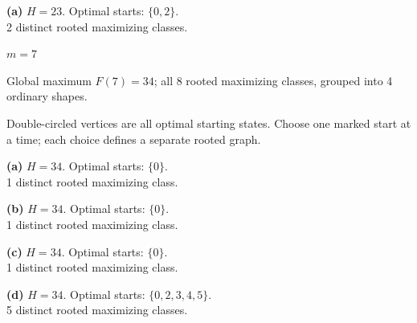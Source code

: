 \documentclass[11pt,a4paper]{article}
\begin{document}
\begin{minipage}[t]{.94\textwidth}\centering
\resizebox{10.3cm}{!}{}\par
\small\textbf{(a)} $H=23$. Optimal starts: $\{0, 2\}$.\\2 distinct rooted maximizing classes.\par\end{minipage}
\clearpage
{\LARGE\bfseries $m=7$}\par\vspace{3mm}
Global maximum $F(7)=34$; all 8 rooted maximizing classes, grouped into 4 ordinary shapes.\par\vspace{2mm}
Double-circled vertices are all optimal starting states. Choose one marked start at a time; each choice defines a separate rooted graph.\par\vspace{3mm}
\begin{minipage}[t]{.48\textwidth}\centering
\resizebox{6.9cm}{!}{}\par
\small\textbf{(a)} $H=34$. Optimal starts: $\{0\}$.\\1 distinct rooted maximizing class.\par\end{minipage}
\hfill
\begin{minipage}[t]{.48\textwidth}\centering
\resizebox{6.9cm}{!}{}\par
\small\textbf{(b)} $H=34$. Optimal starts: $\{0\}$.\\1 distinct rooted maximizing class.\par\end{minipage}
\par\vspace{5mm}
\begin{minipage}[t]{.48\textwidth}\centering
\resizebox{6.9cm}{!}{}\par
\small\textbf{(c)} $H=34$. Optimal starts: $\{0\}$.\\1 distinct rooted maximizing class.\par\end{minipage}
\hfill
\begin{minipage}[t]{.48\textwidth}\centering
\resizebox{6.9cm}{!}{}\par
\small\textbf{(d)} $H=34$. Optimal starts: $\{0, 2, 3, 4, 5\}$.\\5 distinct rooted maximizing classes.\par\end{minipage}
\end{document}

